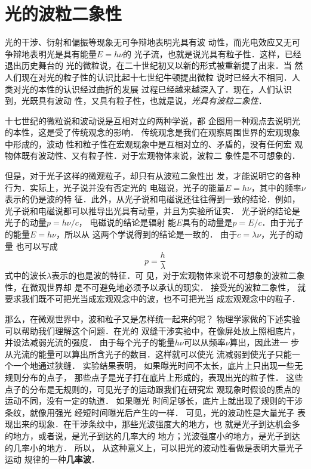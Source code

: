 \section{光的波粒二象性}
光的干涉、衍射和偏振等现象无可争辩地表明光具有波
动性，而光电效应又无可争辩地表明光是具有能量$E=h\nu$的
光子流，也就是说光具有粒子性．这样，已经退出历史舞台的
光的微粒说，在二十世纪初又以新的形式被重新提了出来．当
然人们现在对光的粒子性的认识比起十七世纪牛顿提出微粒
说时已经大不相同．人类对光的本性的认识经过曲折的发展
过程已经越来越深入了．现在，人们认识到，光既具有波动
性，又具有粒子性，也就是说，\textit{光具有波粒二象性}．

十七世纪的微粒说和波动说是互相对立的两种学说，都
企图用一种观点去说明光的本性，这是受了传统观念的影响．
传统观念是我们在观察周围世界的宏观现象中形成的，波动
性和粒子性在宏观现象中是互相对立的、矛盾的，没有任何宏
观物体既有波动性、又有粒子性．对于宏观物体来说，波粒二
象性是不可想象的．

但是，对于光子这样的微观粒子，却只有从波粒二象性出
发，才能说明它的各种行为．实际上，光子说并没有否定光的
电磁说，光子的能量$E=h\nu$，其中的频率$\nu$表示的仍是波的特
征．此外，从光子说和电磁说还往往得到一致的结论．例如，
光子说和电磁说都可以推导出光具有动量，并且为实验所证实．
光子说的结论是光子的动量$p=h\nu/c$，
电磁说的结论是辐射
能$E$具有的动量是$p=E/c$．由于光子的能量$E=h\nu$，所以从
这两个学说得到的结论是一致的．
由于$c=\lambda\nu$，光子的动量
也可以写成
$$p=\frac{h}{\lambda}$$
式中的波长$\lambda$表示的也是波的特征．可
见，对于宏观物体来说不可想象的波粒二象性，在微观世界却
是不可避免地必须予以承认的现实．
接受光的波粒二象性，
就要求我们既不可把光当成宏观观念中的波，也不可把光当
成宏观观念中的粒子．

那么，在微观世界中，波和粒子又是怎样统一起来的呢？
物理学家做的下述实验可以帮助我们理解这个问题．在光的
双缝干涉实验中，在像屏处放上照相底片，并设法减弱光流的强度．
由于每个光子的能量$h\nu$可以从频率$\nu$算出，因此进一
步从光流的能量可以算出所含光子的数目．这样就可以使光
流减弱到使光子只能一个一个地通过狭缝．
实验结果表明，
如果曝光时间不太长，底片上只出现一些无规则分布的点子，
那些点子是光子打在底片上形成的，表现出光的粒子性．
这些点子的分布是无规则的，可见光子的运动跟我们在研究宏
观现象时假设的质点的运动不同，没有一定的轨道．
如果曝光
时间足够长，底片上就出现了规则的干涉条纹，就像用强光
经短时间曝光后产生的一样．
可见，光的波动性是大量光子
表现出来的现象．在干涉条纹中，那些光波强度大的地方，也
就是光子到达机会多的地方，或者说，是光子到达的几率大的
地方；光波强度小的地方，是光子到达的几率小的地方．
所以，
从这种意义上，可以把光的波动性看做是表明大量光子运动
规律的一种\textbf{几率波}．

